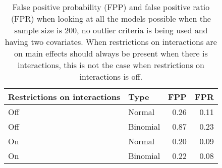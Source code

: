 \begin{longtable}{llrr}
\caption{False positive probability (FPP) and false positive ratio (FPR) when looking at all the models possible when the sample size is 200, no outlier criteria is being used and having two covariates. When restrictions on interactions are on main effects should always be present when there is interactions, this is not the case when restrictions on interactions is off. } \\ 
  \hline
Restrictions on interactions & Type & FPP & FPR \\ 
  \hline
Off & Normal & 0.26 & 0.11 \\ 
  Off & Binomial & 0.87 & 0.23 \\ 
  On & Normal & 0.20 & 0.09 \\ 
  On & Binomial & 0.22 & 0.08 \\ 
   \hline
\hline
\end{longtable}
